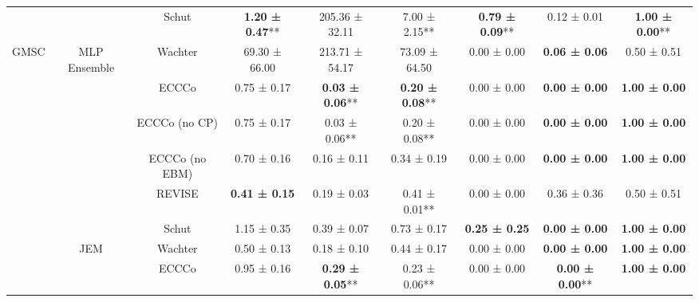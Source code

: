 \begin{table}
{\begin{tabular}[t]{ccccccccc}
 &  & Schut & \textbf{1.20 ± 0.47}** & 205.36 ± 32.11\hphantom{*}\hphantom{*} & 7.00 ± 2.15** & \textbf{0.79 ± 0.09}** & 0.12 ± 0.01\hphantom{*}\hphantom{*} & \textbf{1.00 ± 0.00}**\\

\multirow[t]{-16}{*}{\centering\arraybackslash GMSC} & \multirow[t]{-4}{*}{\centering\arraybackslash MLP Ensemble} & Wachter & 69.30 ± 66.00\hphantom{*}\hphantom{*} & 213.71 ± 54.17\hphantom{*}\hphantom{*} & 73.09 ± 64.50\hphantom{*}\hphantom{*} & 0.00 ± 0.00\hphantom{*}\hphantom{*} & \textbf{0.06 ± 0.06}\hphantom{*}\hphantom{*} & 0.50 ± 0.51\hphantom{*}\hphantom{*}\\
\cmidrule{1-9}
 &  & ECCCo & 0.75 ± 0.17\hphantom{*}\hphantom{*} & \textbf{0.03 ± 0.06}** & \textbf{0.20 ± 0.08}** & 0.00 ± 0.00\hphantom{*}\hphantom{*} & \textbf{0.00 ± 0.00}\hphantom{*}\hphantom{*} & \textbf{1.00 ± 0.00}\hphantom{*}\hphantom{*}\\

 &  & ECCCo (no CP) & 0.75 ± 0.17\hphantom{*}\hphantom{*} & 0.03 ± 0.06** & 0.20 ± 0.08** & 0.00 ± 0.00\hphantom{*}\hphantom{*} & \textbf{0.00 ± 0.00}\hphantom{*}\hphantom{*} & \textbf{1.00 ± 0.00}\hphantom{*}\hphantom{*}\\

 &  & ECCCo (no EBM) & 0.70 ± 0.16\hphantom{*}\hphantom{*} & 0.16 ± 0.11\hphantom{*}\hphantom{*} & 0.34 ± 0.19\hphantom{*}\hphantom{*} & 0.00 ± 0.00\hphantom{*}\hphantom{*} & \textbf{0.00 ± 0.00}\hphantom{*}\hphantom{*} & \textbf{1.00 ± 0.00}\hphantom{*}\hphantom{*}\\

 &  & REVISE & \textbf{0.41 ± 0.15}\hphantom{*}\hphantom{*} & 0.19 ± 0.03\hphantom{*}\hphantom{*} & 0.41 ± 0.01** & 0.00 ± 0.00\hphantom{*}\hphantom{*} & 0.36 ± 0.36\hphantom{*}\hphantom{*} & 0.50 ± 0.51\hphantom{*}\hphantom{*}\\

 &  & Schut & 1.15 ± 0.35\hphantom{*}\hphantom{*} & 0.39 ± 0.07\hphantom{*}\hphantom{*} & 0.73 ± 0.17\hphantom{*}\hphantom{*} & \textbf{0.25 ± 0.25}\hphantom{*}\hphantom{*} & \textbf{0.00 ± 0.00}\hphantom{*}\hphantom{*} & \textbf{1.00 ± 0.00}\hphantom{*}\hphantom{*}\\

 & \multirow[t]{-6}{*}{\centering\arraybackslash JEM} & Wachter & 0.50 ± 0.13\hphantom{*}\hphantom{*} & 0.18 ± 0.10\hphantom{*}\hphantom{*} & 0.44 ± 0.17\hphantom{*}\hphantom{*} & 0.00 ± 0.00\hphantom{*}\hphantom{*} & \textbf{0.00 ± 0.00}\hphantom{*}\hphantom{*} & \textbf{1.00 ± 0.00}\hphantom{*}\hphantom{*}\\
\cmidrule{2-9}
 &  & ECCCo & 0.95 ± 0.16\hphantom{*}\hphantom{*} & \textbf{0.29 ± 0.05}** & 0.23 ± 0.06** & 0.00 ± 0.00\hphantom{*}\hphantom{*} & \textbf{0.00 ± 0.00}** & \textbf{1.00 ± 0.00}\hphantom{*}\hphantom{*}\\


\end{tabular}}
\end{table}
